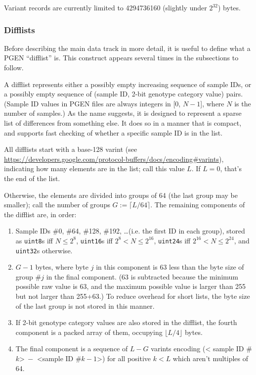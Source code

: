\documentclass[8pt]{article}
\begin{document}
Variant records are currently limited to 4294736160 (slightly under $2^{32}$)
bytes.

\subsubsection{Difflists}

Before describing the main data track in more detail, it is useful to define
what a PGEN ``difflist'' is.  This construct appears several times in the
subsections to follow.

A difflist represents either a possibly empty increasing sequence of sample
IDs, or a possibly empty sequence of (sample ID, 2-bit genotype category value)
pairs.  (Sample ID values in PGEN files are always integers in [0, $N-1$],
where $N$ is the number of samples.)  As the name suggests, it is designed to
represent a sparse list of differences from something else.  It does so in a
manner that is compact, and supports fast checking of whether a specific sample
ID is in the list.

All difflists start with a base-128 varint (see
\url{https://developers.google.com/protocol-buffers/docs/encoding#varints}),
indicating how many elements are in the list; call this value $L$.  If $L=0$,
that's the end of the list.

Otherwise, the elements are divided into groups of 64 (the last group may be
smaller); call the number of groups $G:=\lceil L/64\rceil $.  The remaining
components of the difflist are, in order:

\begin{enumerate}
\item Sample IDs \#0, \#64, \#128, \#192, \ldots (i.e. the first ID in each
  group), stored as \texttt{uint8}s iff $N\leq 2^8$, \texttt{uint16}s iff
  $2^8<N\leq 2^{16}$, \texttt{uint24}s iff $2^{16}<N\leq 2^{24}$, and
  \texttt{uint32}s otherwise.
\item $G-1$ bytes, where byte $j$ in this component is 63 less than the byte
  size of group \#$j$ in the final component.  (63 is subtracted because the
  minimum possible raw value is 63, and the maximum possible value is larger
  than 255 but not larger than 255+63.)  To reduce overhead for short lists,
  the byte size of the last group is not stored in this manner.
\item If 2-bit genotype category values are also stored in the difflist, the
  fourth component is a packed array of them, occupying $\lfloor L/4\rfloor $
  bytes.
\item The final component is a sequence of $L-G$ varints encoding (\textless
  sample ID \#$k$\textgreater $\>-$ \textless sample ID \#$k-1$\textgreater)
  for all positive $k<L$ which aren't multiples of 64.
\end{enumerate}
\end{document}
